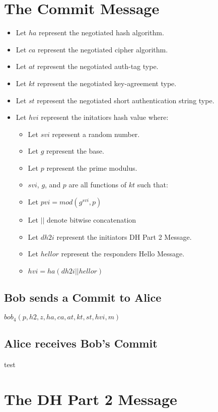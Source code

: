 \documentclass[11pt]{article}
\begin{document}
  \section*{The Commit Message}
  \begin{itemize}
    \item Let $ha$ represent the negotiated hash algorithm.
    \item Let $ca$ represent the negotiated cipher algorithm.
    \item Let $at$ represent the negotiated auth-tag type.
    \item Let $kt$ represent the negotiated key-agreement type.
    \item Let $st$ represent the negotiated short authentication
            string type.
    \item Let $hvi$ represent the initatiors hash value where:
      \begin{itemize}
        \item Let $svi$ represent a random number.
        \item Let $g$ represent the base.
        \item Let $p$ represent the prime modulus.
        \item $svi$, $g$, and $p$ are all functions of $kt$
              such that: 
        \item Let $pvi = mod(g^{svi},p)$
        \item Let $||$ denote bitwise concatenation
        \item Let $dh2i$ represent the initiators DH Part 2 Message.
        \item Let $hellor$ represent the responders Hello Message.
        \item $hvi = ha(dh2i || hellor)$
      \end{itemize}
  \end{itemize}
  \subsection{Bob sends a Commit to Alice}
  $bob_4(p,h2,z,ha,ca,at,kt,st,hvi,m)$
  \subsection{Alice receives Bob's Commit}
  test
  \section{The DH Part 2 Message}
\end{document}
